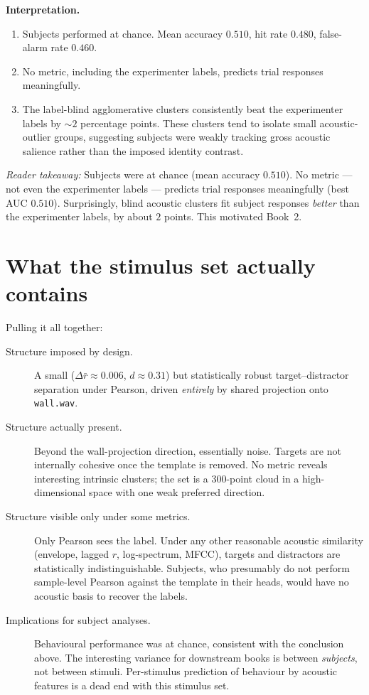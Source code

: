 \documentclass[11pt]{article}
\newcommand{\pkey}[1]{\par\medskip\noindent\textit{Reader takeaway:} #1\par\smallskip}
\begin{document}
\textbf{Interpretation.}
\begin{enumerate}[leftmargin=*]
\item Subjects performed at chance.  Mean accuracy $0.510$, hit rate
$0.480$, false-alarm rate $0.460$.
\item No metric, including the experimenter labels, predicts trial
responses meaningfully.
\item The label-blind agglomerative clusters consistently beat the
experimenter labels by $\sim 2$ percentage points.  These clusters tend
to isolate small acoustic-outlier groups, suggesting subjects were
weakly tracking gross acoustic salience rather than the imposed
identity contrast.
\end{enumerate}
\pkey{Subjects were at chance (mean accuracy $0.510$). No metric --- not even
the experimenter labels --- predicts trial responses meaningfully (best AUC
$0.510$). Surprisingly, blind acoustic clusters fit subject responses
\emph{better} than the experimenter labels, by about $2$ points. This
motivated Book~2.}

\section{What the stimulus set actually contains}

Pulling it all together:

\begin{description}
\item[Structure imposed by design.]
A small ($\Delta\bar r \approx 0.006$, $d \approx 0.31$) but
statistically robust target--distractor separation under Pearson, driven
\emph{entirely} by shared projection onto \texttt{wall.wav}.
\item[Structure actually present.]
Beyond the wall-projection direction, essentially noise.  Targets are
not internally cohesive once the template is removed.  No metric
reveals interesting intrinsic clusters; the set is a $300$-point cloud
in a high-dimensional space with one weak preferred direction.
\item[Structure visible only under some metrics.]
Only Pearson sees the label.  Under any other reasonable acoustic
similarity (envelope, lagged $r$, log-spectrum, MFCC), targets and
distractors are statistically indistinguishable.  Subjects, who
presumably do not perform sample-level Pearson against the template in
their heads, would have no acoustic basis to recover the labels.
\item[Implications for subject analyses.]
Behavioural performance was at chance, consistent with the conclusion
above.  The interesting variance for downstream books is between
\emph{subjects}, not between stimuli.  Per-stimulus prediction of
behaviour by acoustic features is a dead end with this stimulus set.
\end{description}
\end{document}
